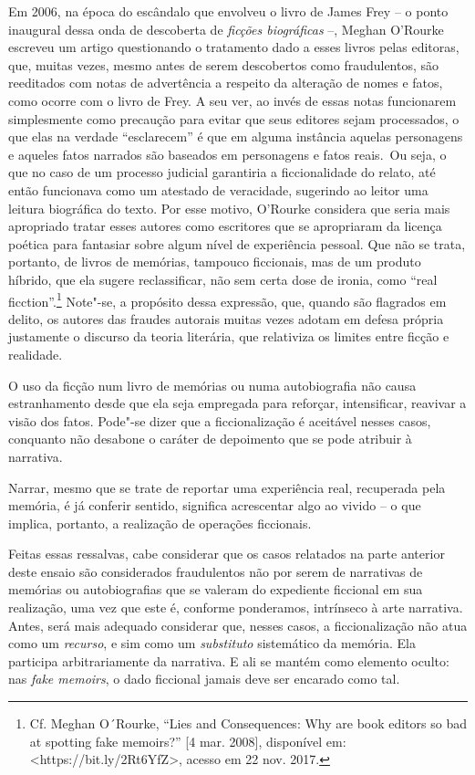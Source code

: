 Em 2006, na época do escândalo que envolveu o livro de James Frey -- o
ponto inaugural dessa onda de descoberta de \emph{ficções biográficas}
--, Meghan O'Rourke escreveu um artigo questionando o tratamento dado a
esses livros pelas editoras, que, muitas vezes, mesmo antes de serem
descobertos como fraudulentos, são reeditados com notas de advertência a
respeito da alteração de nomes e fatos, como ocorre com o livro de Frey.
A seu ver, ao invés de essas notas funcionarem simplesmente como
precaução para evitar que seus editores sejam processados, o que elas na
verdade ``esclarecem'' é que em alguma instância aquelas personagens e
aqueles fatos narrados são baseados em personagens e fatos reais.~Ou
seja, o que no caso de um processo judicial garantiria a ficcionalidade
do relato, até então funcionava como um atestado de veracidade,
sugerindo ao leitor uma leitura biográfica do texto. Por esse motivo,
O'Rourke considera que seria mais apropriado tratar esses autores como
escritores que se apropriaram da licença poética para fantasiar sobre
algum nível de experiência pessoal. Que não se trata, portanto, de
livros de memórias, tampouco ficcionais, mas de um produto híbrido, que
ela sugere reclassificar, não sem certa dose de ironia, como ``real
ficction''.\footnote{Cf. Meghan O´Rourke, ``Lies and Consequences: Why
  are book editors so bad at spotting fake memoirs?'' {[}4 mar. 2008{]},
  disponível em:
  \textless{}https://bit.ly/2Rt6YfZ\textgreater{},
  acesso em 22 nov. 2017.} Note"-se, a propósito dessa expressão, que,
quando são flagrados em delito, os autores das fraudes autorais muitas
vezes adotam em defesa própria justamente o discurso da teoria
literária, que relativiza os limites entre ficção e realidade.

O uso da ficção num livro de memórias ou numa autobiografia não causa
estranhamento desde que ela seja empregada para reforçar, intensificar,
reavivar a visão dos fatos. Pode"-se dizer que a ficcionalização é
aceitável nesses casos, conquanto não desabone o caráter de depoimento
que se pode atribuir à narrativa.

Narrar, mesmo que se trate de reportar uma experiência real, recuperada
pela memória, é já conferir sentido, significa acrescentar algo ao
vivido -- o que implica, portanto, a realização de operações ficcionais.

Feitas essas ressalvas, cabe considerar que os casos relatados na parte
anterior deste ensaio são considerados fraudulentos não por serem de
narrativas de memórias ou autobiografias que se valeram do expediente
ficcional em sua realização, uma vez que este é, conforme ponderamos,
intrínseco à arte narrativa. Antes, será mais adequado considerar que,
nesses casos, a ficcionalização não atua como um \emph{recurso}, e sim
como um \emph{substituto} sistemático da memória. Ela participa
arbitrariamente da narrativa. E ali se mantém como elemento oculto: nas
\emph{fake memoirs}, o dado ficcional jamais deve ser encarado como tal.

